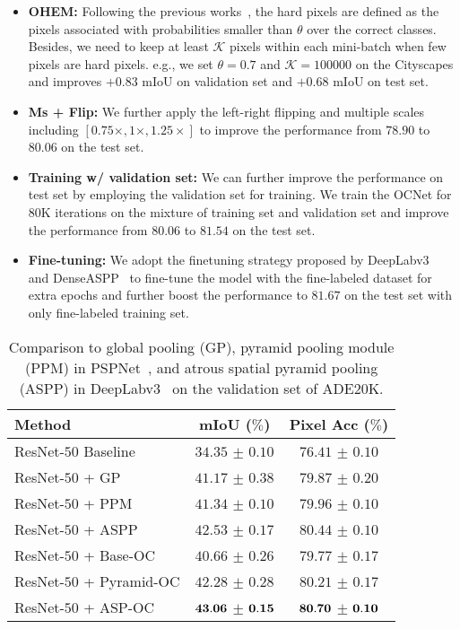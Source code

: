 \documentclass[10pt,twocolumn,letterpaper]{article}
\begin{document}
\begin{itemize}
\item
{\textbf{OHEM:}
Following the previous works~\cite{wu2016high}, the hard pixels are defined as the pixels associated with probabilities smaller than $\theta$ over the correct classes. Besides, we need to keep at least $\mathcal{K}$ pixels within each mini-batch when few pixels are hard pixels. e.g., we set $\theta=0.7$ and $\mathcal{K}=100000$ on the Cityscapes and improves $+0.83$ mIoU on validation set and $+0.68$ mIoU on test set.}
\item
{\textbf{Ms + Flip:}
We further apply the left-right flipping and multiple scales including $[0.75\times, 1\times, 1.25\times]$ to improve the performance from $78.90$ to $80.06$ on the test set.}
\item
{\textbf{Training w/ validation set:}
We can further improve the performance on test set by employing the validation set for training.
We train the OCNet for 80K iterations on the mixture of training set and validation set and improve the performance from $80.06$ to $81.54$ on the test set.
}

\item
\textbf{Fine-tuning:}
We adopt the finetuning strategy proposed by DeepLabv3~\cite{chen2017rethinking} and DenseASPP~\cite{Yang_2018_CVPR} to fine-tune the model with the fine-labeled dataset for extra epochs
and further boost the performance to $81.67$ on the test set with only fine-labeled training set.
\end{itemize}


\begin{table}[htb]
\centering
\footnotesize
\caption{\small{Comparison to global pooling (GP), pyramid pooling module (PPM) in PSPNet~\cite{zhao2017pyramid},
and atrous spatial pyramid pooling (ASPP) in DeepLabv3~\cite{chen2017rethinking} on the validation set of ADE20K.}}
\begin{tabular}{l|c|c} \hline
Method & mIoU ($\%$) & Pixel Acc ($\%$)  \\
\hline
ResNet-$50$ Baseline  &   $34.35$ $\pm$ $0.10$  &  $76.41$ $\pm$ $0.10$  \\
\hline
ResNet-$50$ + GP~\cite{liu2015parsenet}  &   $41.17$ $\pm$ $0.38$  &  $79.87$ $\pm$ $0.20$  \\
ResNet-$50$ + PPM~\cite{zhao2017pyramid}  &  $41.34$ $\pm$ $0.10$  &  $79.96$ $\pm$ $0.10$  \\
ResNet-$50$ + ASPP~\cite{chen2017rethinking} &  $42.53$ $\pm$ $0.17$  &  $80.44$ $\pm$ $0.10$ \\
\hline
ResNet-$50$ + Base-OC  &  $40.66$ $\pm$ $0.26$ &  $79.77$ $\pm$ $0.17$  \\
ResNet-$50$ + Pyramid-OC  &  $42.28$ $\pm$ $0.28$  &  $80.21$ $\pm$ $0.17$ \\
ResNet-$50$ + ASP-OC &  $\bf{43.06}$ $\pm$ $\bf{0.15}$ &  $\bf{80.70}$ $\pm$ $\bf{0.10}$  \\
\hline
\end{tabular}
\label{table:ocvsppmasppgc_ade}
\end{table}
\end{document}
